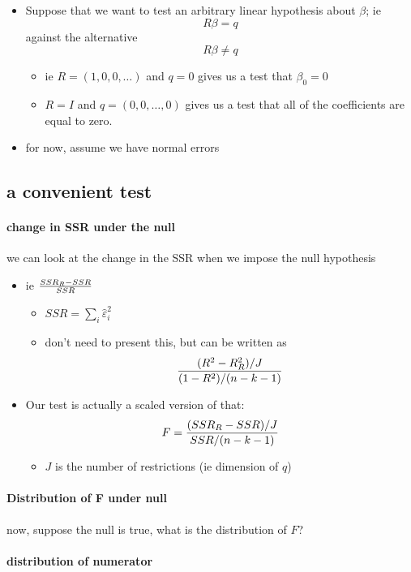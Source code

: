 \begin{itemize}
\item Suppose that we want to test an arbitrary linear hypothesis about
       $\beta$; ie \[R \beta = q\] against the alternative \[R \beta \neq q\]
\begin{itemize}
\item ie $R = (1, 0, 0, \dots)$ and $q = 0$ gives us a test that
         $\beta_0 = 0$
\item $R = I$ and $q = (0,0,\dots,0)$ gives us a test that all of the
         coefficients are equal to zero.
\end{itemize}
\item for now, assume we have normal errors
\end{itemize}
\subsection{a convenient test}
\label{sec-2-2}
\paragraph{change in SSR under the null}
\label{sec-2-2-1}

      we can look at the change in the SSR when we impose the null
        hypothesis
\begin{itemize}
\item ie ${SSR_R - SSR \over SSR}$
\begin{itemize}
\item $SSR = \sum_i \hat\varepsilon_i^2$
\item don't need to present this, but can be written as \[
            {(R^2 - R^2_R) / J \over (1-R^2) / (n-k-1)} \]
\end{itemize}
\item Our test is actually a scaled version of that:
          \[ F = {(SSR_R - SSR)/J \over SSR / (n-k-1)} \]
\begin{itemize}
\item $J$ is the number of restrictions (ie dimension of $q$)
\end{itemize}
\end{itemize}
\paragraph{Distribution of F under null}
\label{sec-2-2-2}

      now, suppose the null is true, what is the distribution of $F$?
\paragraph{distribution of numerator}
\label{sec-2-2-2-1}


